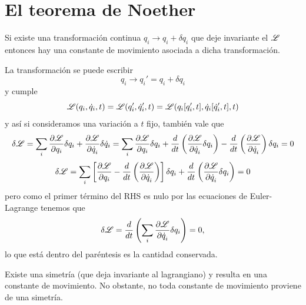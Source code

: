 \documentclass[10pt,oneside]{CBFT_book}
\begin{document}
\section{El teorema de Noether}

Si existe una transformación continua $q_i \longrightarrow q_i + \delta q_i$ que deje invariante el
$\mathscr{L}$ entonces hay una constante de movimiento asociada a dicha transformación.

La transformación se puede escribir 
\[
	q_i \longrightarrow q_i' = q_i + \delta q_i
\]
y cumple 
\[
	\mathscr{L}(q_i, \dot{q}_i , t) = \mathscr{L}(q_i', \dot{q}_i' , t) =
	\mathscr{L}(q_i[q_i',t], \dot{q}_i[\dot{q}_i',t] , t)
\]
y así si consideramos una variación a $t$ fijo, también vale que 
\[
	\delta \mathscr{L} = \sum_i \frac{\partial^{\hspace{-0.05em}} {\mathscr{L}}}{\partial {q_i}^{\hspace{-0.05em}}}\delta q_i + \frac{\partial^{\hspace{-0.05em}} {\mathscr{L}}}{\partial {\dot{q}_i}^{\hspace{-0.05em}}}\delta \dot{q}_i =
	\sum_i \frac{\partial^{\hspace{-0.05em}} {\mathscr{L}}}{\partial {q_i}^{\hspace{-0.05em}}}\delta q_i + \frac{d}{dt}\left( \frac{\partial^{\hspace{-0.05em}} {\mathscr{L}}}{\partial {\dot{q}_i}^{\hspace{-0.05em}}}\delta q_i \right)
	- \frac{d}{dt}\left( \frac{\partial^{\hspace{-0.05em}} {\mathscr{L}}}{\partial {\dot{q}_i}^{\hspace{-0.05em}}} \right) \delta q_i = 0
\]
\[
	\delta \mathscr{L} = \sum_i \left[ \frac{\partial^{\hspace{-0.05em}} {\mathscr{L}}}{\partial {q_i}^{\hspace{-0.05em}}} - \frac{d}{dt}\left( \frac{\partial^{\hspace{-0.05em}} {\mathscr{L}}}{\partial {\dot{q}_i}^{\hspace{-0.05em}}} \right) \right]
	\delta q_i + \frac{d}{dt}\left( \frac{\partial^{\hspace{-0.05em}} {\mathscr{L}}}{\partial {\dot{q}_i}^{\hspace{-0.05em}}}\delta q_i \right) = 0
\]
pero como el primer término del RHS es nulo por las ecuaciones de Euler-Lagrange tenemos que 
\[
	\delta \mathscr{L} = \frac{d}{dt}\left( \sum_i \frac{\partial^{\hspace{-0.05em}} {\mathscr{L}}}{\partial {\dot{q}_i}^{\hspace{-0.05em}}}\delta q_i \right)  = 0,
\]
lo que está dentro del paréntesis es la cantidad conservada. 

Existe una simetría (que deja invariante al lagrangiano) y resulta en una constante de movimiento.
No obstante, no toda constante de movimiento proviene de una simetría.
\end{document}
